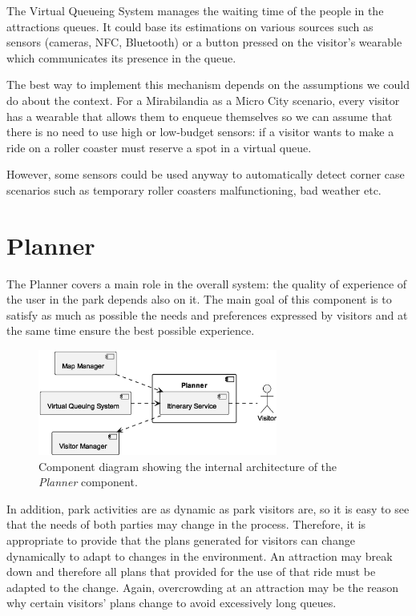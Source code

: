 The Virtual Queueing System manages the waiting time of the people in the attractions queues. It could base its estimations on various sources such
as sensors (cameras, NFC, Bluetooth) or a button pressed on the visitor's wearable which communicates its presence in the queue.

The best way to implement this mechanism depends on the assumptions we could do about the context. For a Mirabilandia as a Micro City scenario, every
visitor has a wearable that allows them to enqueue themselves so we can assume that there is no need to use high or low-budget sensors: if a visitor
wants to make a ride on a roller coaster must reserve a spot in a virtual queue.

However, some sensors could be used anyway to automatically detect corner case scenarios such as temporary roller coasters malfunctioning, bad weather etc.

\section{Planner}\label{sec:planner}

The Planner covers a main role in the overall system: the quality of experience of the user in the park depends also on it. The main goal of this
component is to satisfy as much as possible the needs and preferences expressed by visitors and at the same time ensure the best possible experience.

\begin{figure}[H]
	\centering
	\includegraphics[width=0.7\textwidth]{img/planner.eps}
	\caption{Component diagram showing the internal architecture of the \textit{Planner} component.}
	\label{fig:planner-arch}
\end{figure}

In addition, park activities are as dynamic as park visitors are, so it is easy to see that the needs of both parties may change in the process.
Therefore, it is appropriate to provide that the plans generated for visitors can change dynamically to adapt to changes in the environment. An
attraction may break down and therefore all plans that provided for the use of that ride must be adapted to the change. Again, overcrowding at an
attraction may be the reason why certain visitors' plans change to avoid excessively long queues.

